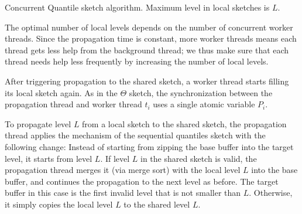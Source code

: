 \begin{algorithm*}[tb]
\begin{multicols}{2}
\begin{algorithmic}[1]
\end{algorithmic}
\end{multicols}
\caption{Concurrent Quantile sketch algorithm. Maximum level in local sketches is $L$.}
\label{alg:concurrent-quantile}
\end{algorithm*}


The optimal number of local levels depends on the number of
concurrent worker threads.
Since  the propagation time is constant, more worker threads means each thread gets
less help from the background thread; we thus make sure that each thread needs help
less frequently by increasing the number of
local levels. 

After triggering propagation to the shared sketch,
a worker thread starts filling its local sketch again.
As in the $\Theta$ sketch, the synchronization between the
propagation thread and  worker thread $t_i$ uses a 
single atomic variable $P_i$.

To propagate level $L$ from a local sketch to the shared sketch,
the propagation thread applies the mechanism of the
sequential quantiles sketch with the following
change:
Instead of starting from zipping the base buffer
into the target level, it starts from level $L$.
If level $L$ in the shared sketch is valid, the propagation
thread merges it (via merge sort) with the local level $L$ into
the base buffer, and continues the propagation to the next level
as before.
The target buffer in this case is the first invalid level that is
not smaller than $L$.
Otherwise, it simply copies the local level $L$ to the shared level
$L$.

